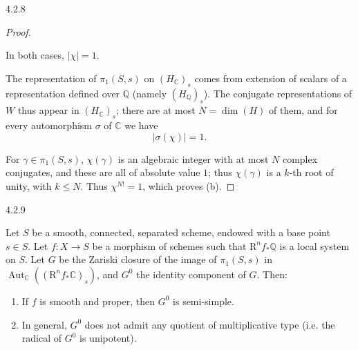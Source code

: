 \begin{corollary}{4.2.8}
\begin{proof}
\begin{enumerate}
      \end{enumerate}\par{}In both cases, \(|\chi |=1\).\par{}The representation of \(\pi _1(S,s)\) on \((H_\mathbb {C})_s\) comes from extension of scalars of a representation defined over \(\mathbb {Q}\) (namely \((H_\mathbb {Q})_s\)).
      The conjugate representations of \(W\) thus appear in \((H_\mathbb {C})_s\);
      there are at most \(N=\dim (H)\) of them, and for every automorphism \(\sigma \) of \(\mathbb {C}\) we have
      \[         |\sigma (\chi )|         = 1.       \]\par{}For \(\gamma \in \pi _1(S,s)\), \(\chi (\gamma )\) is an algebraic integer with at most \(N\) complex conjugates, and these are all of absolute value \(1\);
      thus \(\chi (\gamma )\) is a \(k\)-th root of unity, with \(k\leqslant  N\).
      Thus \(\chi ^{N!}=1\), which proves (b).\end{proof}\end{corollary}\begin{corollary}{4.2.9}\label{hodge-theory-ii-4.2.9}\skipsinglepar\par{}Let \(S\) be a smooth, connected, separated scheme, endowed with a base point \(s\in  S\).
    Let \(f\colon  X\to  S\) be a morphism of schemes such that \(\mathrm {R}^nf_*\mathbb {Q}\) is a local system on \(S\).
    Let \(G\) be the Zariski closure of the image of \(\pi _1(S,s)\) in \(\operatorname {Aut}_\mathbb {C}((\mathrm {R}^nf_*\mathbb {C})_s)\), and \(G^0\) the identity component of \(G\).
    Then:

    
 \begin{enumerate}
      
 \item[(a)]
        If \(f\) is smooth and proper, then \(G^0\) is semi-simple.
      

      
 \item[(b)]
        In general, \(G^0\) does not admit any quotient of multiplicative type (i.e. the radical of \(G^0\) is unipotent).
      


\end{enumerate}
\end{corollary}
